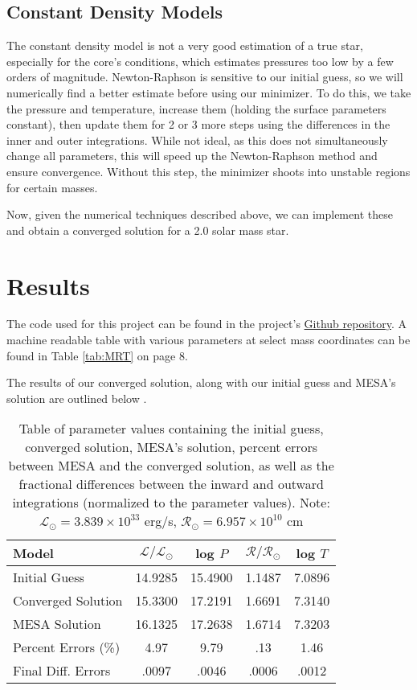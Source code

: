 \documentclass[twocolumn]{aastex631}
\begin{document}
\subsection{Constant Density Models}

The constant density model is not a very good estimation of a true star, especially for the core's conditions, which estimates pressures too low by a few orders of magnitude. Newton-Raphson is sensitive to our initial guess, so we will numerically find a better estimate before using our minimizer. To do this, we take the pressure and temperature, increase them (holding the surface parameters constant), then update them for 2 or 3 more steps using the differences in the inner and outer integrations. While not ideal, as this does not simultaneously change all parameters, this will speed up the Newton-Raphson method and ensure convergence. Without this step, the minimizer shoots into unstable regions for certain masses.

Now, given the numerical techniques described above, we can implement these and obtain a converged solution for a 2.0 solar mass star.

\section{Results}

The code used for this project can be found in the project's \href{https://github.com/pmccreery/ZAMS-code}{Github repository}. A machine readable table with various parameters at select mass coordinates can be found in Table \ref{tab:MRT} on page 8.

The results of our converged solution, along with our initial guess and MESA's solution are outlined below \citep{mesa}.
\begin{table}[ht!]
\centering
\begin{tabular}{ | l | c | c | c | c | }
\hline
Model & $\mathcal{L}/\mathcal{L}_\odot$ & log $P$ & $\mathcal{R}/\mathcal{R}_\odot$ & log $T$ \\
\hline
Initial Guess & 14.9285 & 15.4900 & 1.1487 & 7.0896 \\
\hline
Converged Solution & 15.3300 & 17.2191 & 1.6691 & 7.3140 \\
\hline
MESA Solution & 16.1325 & 17.2638 & 1.6714 & 7.3203 \\
\hline
Percent Errors (\%) & 4.97 & 9.79 & .13 & 1.46 \\
\hline
Final Diff. Errors & .0097 & .0046 & .0006 & .0012 \\
\hline
\end{tabular}
\caption{Table of parameter values containing the initial guess, converged solution, MESA's solution, percent errors between MESA and the converged solution, as well as the fractional differences between the inward and outward integrations (normalized to the parameter values). Note: $\mathcal{L}_\odot = 3.839\times 10^{33} $ erg/s, $\mathcal{R}_\odot = 6.957\times 10^{10} $ cm}
\label{tab:res}
\end{table}
\end{document}

